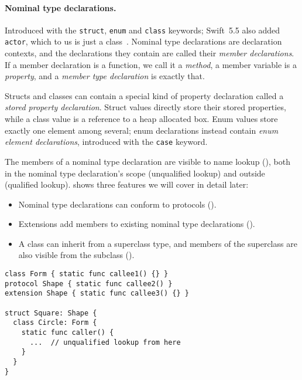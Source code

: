 \documentclass[../generics]{subfiles}
\begin{document}
\paragraph{Nominal type declarations.}
Introduced with the \texttt{struct}, \texttt{enum} and \texttt{class} keywords; Swift~5.5 also added \texttt{actor}, which to us is just a class~\cite{se0306}. Nominal type declarations are declaration contexts, and the declarations they contain are called their \emph{member declarations}. If a member declaration is a function, we call it a \emph{method}, a member variable is a \emph{property}, and a \emph{member type declaration} is exactly that.

Structs and classes can contain a special kind of property declaration called a \emph{stored property declaration}. Struct values directly store their stored properties, while a class value is a reference to a heap allocated box. Enum values store exactly one element among several; enum declarations instead contain \emph{enum element declarations}, introduced with the \texttt{case} keyword.

The members of a nominal type declaration are visible to name lookup (), both in the nominal type declaration's scope (unqualified lookup) and outside (qualified lookup).  shows three features we will cover in detail later:
\begin{itemize}
\item Nominal type declarations can conform to protocols ().
\item Extensions add members to existing nominal type declarations ().
\item A class can inherit from a superclass type, and members of the superclass are also visible from the subclass ().
\end{itemize}

\begin{listing}\label{unqualified lookup listing}
\begin{Verbatim}
class Form { static func callee1() {} }
protocol Shape { static func callee2() }
extension Shape { static func callee3() {} }

struct Square: Shape {
  class Circle: Form {
    static func caller() {
      ...  // unqualified lookup from here
    }
  }
}
\end{Verbatim}
\end{listing}
\end{document}
